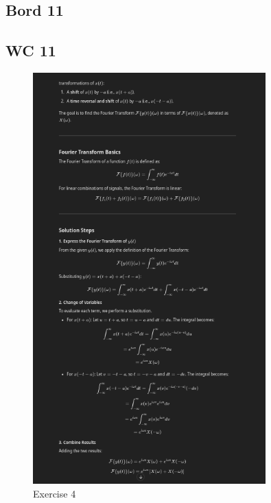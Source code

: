 \documentclass[a4paper]{report}
\begin{document}
\subsection*{Bord 11}





\subsection*{WC 11}



\begin{figure}[H]
	\centering
	\includegraphics[width=0.8\textwidth]{assets/wc_11_ex_4.png}
	\caption{Exercise 4}
	\label{fig:wc_11_ex_4}
\end{figure}
\end{document}
